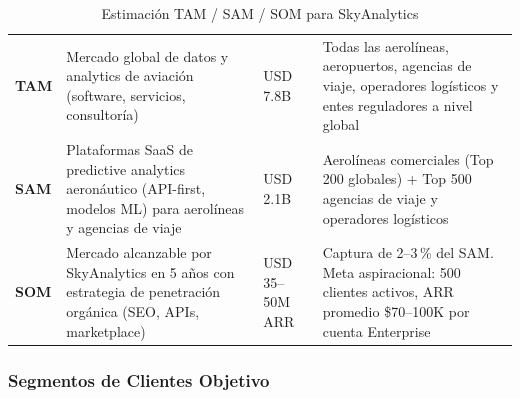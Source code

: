 ﻿\documentclass[11pt, letterpaper]{article}
\begin{document}
\begin{table}[H]

\small

\centering

\begin{tabularx}{\linewidth}{>{\raggedright\arraybackslash}p{3cm} >{\raggedright\arraybackslash}p{3.5cm} >{\raggedright\arraybackslash}p{3.5cm} >{\raggedright\arraybackslash}X}

\toprule

\multicolumn{1}{>{\raggedright\arraybackslash}p{3cm}}{\textbf{Nivel}} &

\multicolumn{1}{>{\raggedright\arraybackslash}p{3.5cm}}{\textbf{Alcance}} &

\multicolumn{1}{>{\raggedright\arraybackslash}p{3.5cm}}{\textbf{Estimación (2030)}} &

\multicolumn{1}{>{\raggedright\arraybackslash}X}{\textbf{Supuestos}} \\

\midrule

\textbf{TAM} & Mercado global de datos y analytics de aviación (software, servicios, consultoría) & USD 7.8B & Todas las aerolíneas, aeropuertos, agencias de viaje, operadores logísticos y entes reguladores a nivel global \\

\textbf{SAM} & Plataformas SaaS de predictive analytics aeronáutico (API-first, modelos ML) para aerolíneas y agencias de viaje & USD 2.1B & Aerolíneas comerciales (Top 200 globales) + Top 500 agencias de viaje y operadores logísticos \\

\textbf{SOM} & Mercado alcanzable por SkyAnalytics en 5 años con estrategia de penetración orgánica (SEO, APIs, marketplace) & USD 35--50M ARR & Captura de 2--3\,\% del SAM. Meta aspiracional: 500 clientes activos, ARR promedio \$70--100K por cuenta Enterprise \\

\bottomrule

\end{tabularx}

\caption{Estimación TAM / SAM / SOM para SkyAnalytics}

\end{table}



\subsubsection{Segmentos de Clientes Objetivo}
\end{document}
